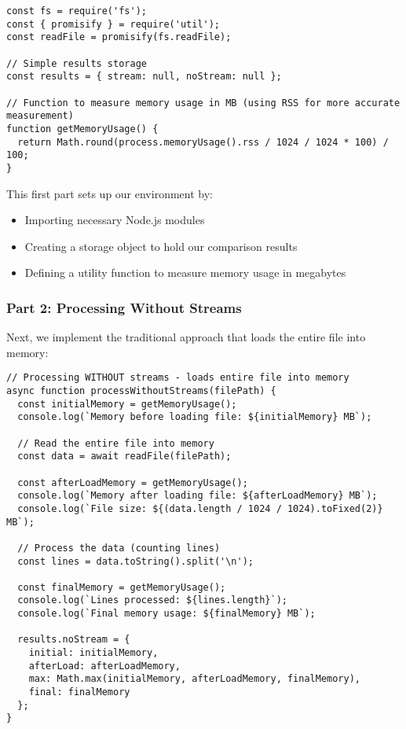 \documentclass[12pt,letterpaper]{article}
\newenvironment{macterminal}{%
    \begin{mdframed}[
        linecolor=terminalFrame,
        backgroundcolor=terminalBg,
        roundcorner=5pt,
        skipabove=5pt,
        skipbelow=5pt,
        linewidth=1pt,
        innertopmargin=5pt,
        frametitle={%
            \tikz[baseline=(current bounding box.east), outer sep=0pt]{
                \fill[red!80!black] (0,0) circle (5pt);
                \fill[yellow!80!black] (0.7,0) circle (5pt);
                \fill[green!70!black] (1.4,0) circle (5pt);
            }
        },
        frametitlealignment=\raggedright,
        frametitleaboveskip=8pt,
        frametitlebelowskip=0pt,
    ]
}{%
    \end{mdframed}%
}
\begin{document}
\begin{macterminal}
\begin{lstlisting}
const fs = require('fs');
const { promisify } = require('util');
const readFile = promisify(fs.readFile);

// Simple results storage
const results = { stream: null, noStream: null };

// Function to measure memory usage in MB (using RSS for more accurate measurement)
function getMemoryUsage() {
  return Math.round(process.memoryUsage().rss / 1024 / 1024 * 100) / 100;
}
\end{lstlisting}
\end{macterminal}

This first part sets up our environment by:
\begin{itemize}
    \item Importing necessary Node.js modules
    \item Creating a storage object to hold our comparison results
    \item Defining a utility function to measure memory usage in megabytes
\end{itemize}

\subsubsection{Part 2: Processing Without Streams}

Next, we implement the traditional approach that loads the entire file into memory:

\begin{macterminal}
\begin{lstlisting}
// Processing WITHOUT streams - loads entire file into memory
async function processWithoutStreams(filePath) {
  const initialMemory = getMemoryUsage();
  console.log(`Memory before loading file: ${initialMemory} MB`);
  
  // Read the entire file into memory
  const data = await readFile(filePath);
  
  const afterLoadMemory = getMemoryUsage();
  console.log(`Memory after loading file: ${afterLoadMemory} MB`);
  console.log(`File size: ${(data.length / 1024 / 1024).toFixed(2)} MB`);
  
  // Process the data (counting lines)
  const lines = data.toString().split('\n');
  
  const finalMemory = getMemoryUsage();
  console.log(`Lines processed: ${lines.length}`);
  console.log(`Final memory usage: ${finalMemory} MB`);
  
  results.noStream = { 
    initial: initialMemory,
    afterLoad: afterLoadMemory,
    max: Math.max(initialMemory, afterLoadMemory, finalMemory), 
    final: finalMemory 
  };
}
\end{lstlisting}
\end{macterminal}
\end{document}
